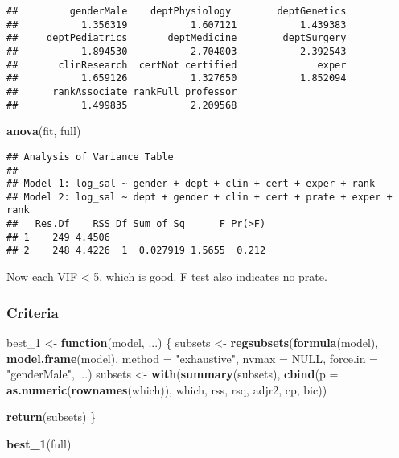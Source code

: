 \documentclass[]{article}
\newenvironment{Shaded}{\begin{snugshade}}{\end{snugshade}}
\newcommand{\ControlFlowTok}[1]{\textcolor[rgb]{0.13,0.29,0.53}{\textbf{#1}}}
\newcommand{\DataTypeTok}[1]{\textcolor[rgb]{0.13,0.29,0.53}{#1}}
\newcommand{\DecValTok}[1]{\textcolor[rgb]{0.00,0.00,0.81}{#1}}
\newcommand{\KeywordTok}[1]{\textcolor[rgb]{0.13,0.29,0.53}{\textbf{#1}}}
\newcommand{\NormalTok}[1]{#1}
\newcommand{\OtherTok}[1]{\textcolor[rgb]{0.56,0.35,0.01}{#1}}
\newcommand{\StringTok}[1]{\textcolor[rgb]{0.31,0.60,0.02}{#1}}
\begin{document}
\begin{verbatim}
##         genderMale    deptPhysiology        deptGenetics 
##           1.356319           1.607121           1.439383 
##     deptPediatrics       deptMedicine        deptSurgery 
##           1.894530           2.704003           2.392543 
##       clinResearch  certNot certified              exper 
##           1.659126           1.327650           1.852094 
##      rankAssociate rankFull professor 
##           1.499835           2.209568
\end{verbatim}

\begin{Shaded}
\begin{Highlighting}[]
\KeywordTok{anova}\NormalTok{(fit, full)}
\end{Highlighting}
\end{Shaded}

\begin{verbatim}
## Analysis of Variance Table
## 
## Model 1: log_sal ~ gender + dept + clin + cert + exper + rank
## Model 2: log_sal ~ dept + gender + clin + cert + prate + exper + rank
##   Res.Df    RSS Df Sum of Sq      F Pr(>F)
## 1    249 4.4506                           
## 2    248 4.4226  1  0.027919 1.5655  0.212
\end{verbatim}

Now each VIF \textless{} 5, which is good. F test also indicates no
prate.

\hypertarget{criteria}{%
\subsubsection{Criteria}\label{criteria}}

\begin{Shaded}
\begin{Highlighting}[]
\NormalTok{best_}\DecValTok{1}\NormalTok{ <-}\StringTok{ }\ControlFlowTok{function}\NormalTok{(model, ...) }
\NormalTok{\{}
\NormalTok{  subsets <-}\StringTok{ }\KeywordTok{regsubsets}\NormalTok{(}\KeywordTok{formula}\NormalTok{(model), }\KeywordTok{model.frame}\NormalTok{(model), }\DataTypeTok{method =} \StringTok{"exhaustive"}\NormalTok{, }\DataTypeTok{nvmax =} \OtherTok{NULL}\NormalTok{, }\DataTypeTok{force.in =} \StringTok{"genderMale"}\NormalTok{,  ...)}
\NormalTok{  subsets <-}\StringTok{ }\KeywordTok{with}\NormalTok{(}\KeywordTok{summary}\NormalTok{(subsets),}
                  \KeywordTok{cbind}\NormalTok{(}\DataTypeTok{p =} \KeywordTok{as.numeric}\NormalTok{(}\KeywordTok{rownames}\NormalTok{(which)), which, rss, rsq, adjr2, cp, bic))}
  
  \KeywordTok{return}\NormalTok{(subsets)}
\NormalTok{\}  }


\KeywordTok{best_1}\NormalTok{(full) }
\end{Highlighting}
\end{Shaded}
\end{document}
